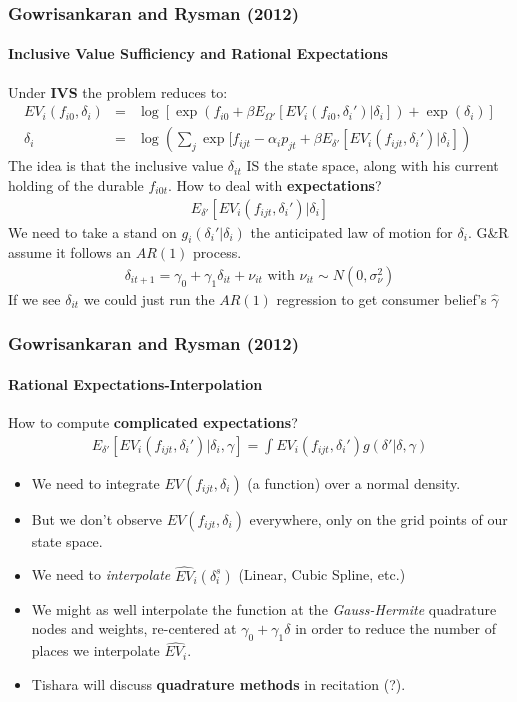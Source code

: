 \documentclass[11pt,aspectratio=169]{beamer}
\begin{document}
\begin{frame}
\frametitle{Gowrisankaran and Rysman (2012)}
\framesubtitle{Inclusive Value Sufficiency and Rational Expectations}\footnotesize
\vspace{-0.3cm}
Under \textbf{IVS} the problem reduces to:
\begin{eqnarray*}
EV_i(f_{i0}, \delta_i) &=& \log\left[ \exp( f_{i0} + \beta E_{\Omega'}[ EV_i (f_{i0},\delta_i') |\delta_i] )+ \exp(\delta_i)  \right]\\
\delta_{i} &=& \log \left( \sum_j \exp[ f_{ijt}  -\alpha_i p_{jt} + \beta E_{\delta'}[ E V_i (f_{ijt}, \delta_i') |\delta_i ]  \right)
\end{eqnarray*}
The idea is that the inclusive value $\delta_{it}$ IS the state space, along with his current holding of the durable $f_{i0t}$. How to deal with \textbf{expectations}? 
\begin{eqnarray*}
E_{\delta'}[ E V_i (f_{ijt},\delta_i') |\delta_i ]
\end{eqnarray*}
We need to take a stand on $g_i(\delta_i' | \delta_i)$ the anticipated law of motion for $\delta_i$.  G\&R assume it follows an $AR(1)$ process.
\begin{eqnarray*}
\delta_{it+1} = \gamma_0 + \gamma_1 \delta_{it} + \nu_{it} \mbox{ with } \nu_{it} \sim N(0,\sigma_{\nu}^2)
\end{eqnarray*}
If we see $\delta_{it}$ we could just run the $AR(1)$ regression to get consumer belief's $\hat{\gamma}$
\end{frame}



\begin{frame}
\frametitle{Gowrisankaran and Rysman (2012)}
\framesubtitle{Rational Expectations-Interpolation}\small
How to compute \textbf{complicated expectations}?
\begin{eqnarray*}
E_{\delta'}[ E V_i (f_{ijt}, \delta_i') |\delta_i ,\gamma]= \int EV_i(f_{ijt},\delta_{i}') g(\delta' | \delta,\gamma)
\end{eqnarray*}
\vspace{-0.5cm}
\begin{itemize}\footnotesize
\item We need to integrate $EV(f_{ijt},\delta_i)$ (a function) over a normal density.
\item But we don't observe $EV(f_{ijt},\delta_i)$ everywhere, only on the grid points of our state space.
\item  We need to \textit{interpolate} $\widehat{EV}_i(\delta_i^s)$ (Linear, Cubic Spline, etc.)
\item We might as well interpolate the function at the \textit{Gauss-Hermite} quadrature nodes and weights, re-centered at $\gamma_0 + \gamma_1 \delta$ in order to reduce the number of places we interpolate $\widehat{EV_i}$.
\item Tishara will discuss \textbf{quadrature methods} in recitation (?).
\end{itemize}
\end{frame}
\end{document}
